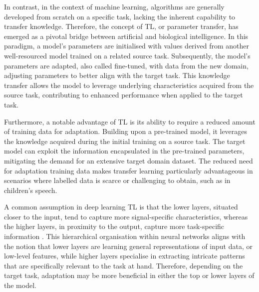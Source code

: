 In contrast, in the context of machine learning, algorithms are generally developed from scratch on a specific task, lacking the inherent capability to transfer knowledge. Therefore, the concept of \ac{TL}, or parameter transfer, has emerged as a pivotal bridge between artificial and biological intelligence. In this paradigm, a model's parameters are initialised with values derived from another well-resourced model trained on a related source task. Subsequently, the model's parameters are adapted, also called fine-tuned, with data from the new domain, adjusting parameters to better align with the target task. This knowledge transfer allows the model to leverage underlying characteristics acquired from the source task, contributing to enhanced performance when applied to the target task.

Furthermore, a notable advantage of \ac{TL} is its ability to require a reduced amount of training data for adaptation. Building upon a pre-trained model, it leverages the knowledge acquired during the initial training on a source task. The target model can exploit the information encapsulated in the pre-trained parameters, mitigating the demand for an extensive target domain dataset. 
The reduced need for adaptation training data makes transfer learning particularly advantageous in scenarios where labelled data is scarce or challenging to obtain, such as in children's speech.

A common assumption in deep learning \ac{TL} is that the lower layers, situated closer to the input, tend to capture more signal-specific characteristics, whereas the higher layers, in proximity to the output, capture more task-specific information \cite{tfbased, yosinski2014transferable}. This hierarchical organisation within neural networks aligns with the notion that lower layers are learning general representations of input data, or low-level features, while higher layers specialise in extracting intricate patterns that are specifically relevant to the task at hand. Therefore, depending on the target task, adaptation may be more beneficial in either the top or lower layers of the model.

